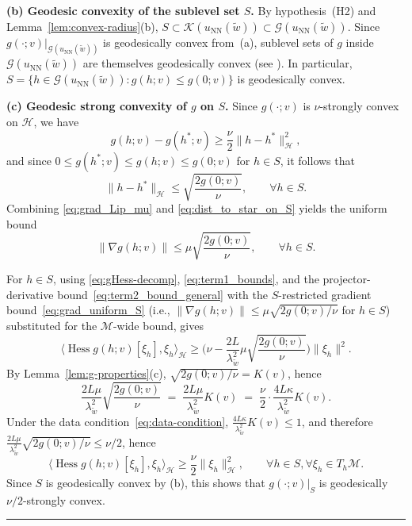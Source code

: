 \documentclass[twoside,11pt]{article}
\newcommand{\BlackBoxProof}{\rule{1.5ex}{1.5ex}}
\renewenvironment{proof}{\par\noindent{\bf Proof\ }}{\hfill\BlackBoxProof\par\medskip}
\newcommand{\Hess}{\operatorname{Hess} }
\newcommand{\NN}{\mathrm{NN}}
\newcommand{\calG}{\mathcal{G}}
\newcommand{\calK}{\mathcal{K}}
\newcommand{\calM}{\mathcal{M}}
\begin{document}
\begin{proof}
\medskip
\noindent\textbf{(b) Geodesic convexity of the sublevel set $S$.}
By hypothesis~(H2) and Lemma~\ref{lem:convex-radius}(b), $S \subset \calK(u_\NN(\tilde w)) \subset \calG(u_\NN(\tilde w))$. Since $g(\cdot;v)|_{\calG(u_\NN(\tilde w))}$ is geodesically convex from~(a), sublevel sets of $g$ inside $\calG(u_\NN(\tilde w))$ are themselves geodesically convex (see \citep[Proposition~11.8]{boumal2023intromanifolds}). In particular, $S=\{h\in\calG(u_\NN(\tilde w)) : g(h;v)\le g(0;v)\}$ is geodesically convex.

\medskip
\noindent\textbf{(c) Geodesic strong convexity of $g$ on $S$.}
Since $g(\cdot;v)$ is $\nu$-strongly convex on $\mathcal H$, we have
\[
g(h;v)-g(h^*;v)\ge \frac{\nu}{2}\|h-h^*\|_{\mathcal H}^2,
\]
and since $0 \leq g(h^*;v)\le g(h;v)\le g(0;v)$ for $h\in S$, it follows that
\begin{equation}\label{eq:dist_to_star_on_S}
\|h-h^*\|_{\mathcal H}\le \sqrt{\frac{2g(0;v)}{\nu}},
\qquad \forall h\in S.
\end{equation}
Combining \eqref{eq:grad_Lip_mu} and \eqref{eq:dist_to_star_on_S} yields the uniform bound
\begin{equation}\label{eq:grad_uniform_S}
\|\nabla g(h;v)\|\le \mu\sqrt{\frac{2g(0;v)}{\nu}},
\qquad \forall h\in S.
\end{equation}

For $h\in S$, using \eqref{eq:gHess-decomp}, \eqref{eq:term1_bounds}, and the projector-derivative bound~\eqref{eq:term2_bound_general} with the $S$-restricted gradient bound~\eqref{eq:grad_uniform_S} (i.e., $\|\nabla g(h;v)\|\le\mu\sqrt{2g(0;v)/\nu}$ for $h\in S$) substituted for the $\calM$-wide bound, gives
\[
\langle \Hess g(h;v)[\xi_h],\xi_h\rangle_{\mathcal H}
\ge \Big(\nu-\frac{2L}{\lambda_{\tilde w}^2}\mu\sqrt{\frac{2g(0;v)}{\nu}}\Big)\|\xi_h\|^2.
\]
By Lemma~\ref{lem:g-properties}(c), $\sqrt{2g(0;v)/\nu}=K(v)$, hence
\begin{equation}\label{eq:K-cond}
\frac{2L\mu}{\lambda_{\tilde w}^{2}}\sqrt{\frac{2g(0;v)}{\nu}}
\;=\; \frac{2L\mu}{\lambda_{\tilde w}^{2}}K(v)
\;=\; \frac{\nu}{2}\cdot\frac{4L\kappa}{\lambda_{\tilde w}^{2}}K(v) .
\end{equation}
Under the data condition~\eqref{eq:data-condition}, $\frac{4L\kappa}{\lambda_{\tilde w}^{2}}K(v)\le 1$, and therefore $\frac{2L\mu}{\lambda_{\tilde w}^{2}}\sqrt{2g(0;v)/\nu}\le \nu/2$, hence
\[
\langle \Hess g(h;v)[\xi_h],\xi_h\rangle_{\mathcal H}
\ge \frac{\nu}{2} \|\xi_h\|_{\mathcal H}^2,
\qquad \forall h\in S,  \forall \xi_h\in T_h\mathcal M.
\]
Since $S$ is geodesically convex by (b), this shows that $g(\cdot;v)|_S$ is geodesically
$\nu/2$-strongly convex.


\end{proof}
\end{document}
